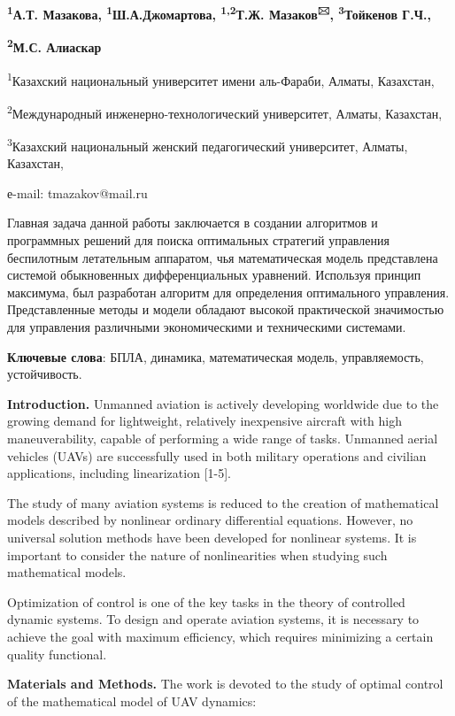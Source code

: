 {\bfseries \textsuperscript{1}А.Т. Мазакова,
\textsuperscript{1}Ш.А.Джомартова, \textsuperscript{1,2}Т.Ж.
Мазаков\textsuperscript{🖂}, \textsuperscript{3}Тойкенов Г.Ч.,}

{\bfseries \textsuperscript{2}М.С. Алиаскар}

\textsuperscript{1}Казахский национальный университет имени аль-Фараби,
Алматы, Казахстан,

\textsuperscript{2}Международный инженерно-технологический университет,
Алматы, Казахстан,

\textsuperscript{3}Казахский национальный женский педагогический
университет, Алматы, Казахстан,

е-mail: tmazakov@mail.ru

Главная задача данной работы заключается в создании алгоритмов и
программных решений для поиска оптимальных стратегий управления
беспилотным летательным аппаратом, чья математическая модель
представлена системой обыкновенных дифференциальных уравнений. Используя
принцип максимума, был разработан алгоритм для определения оптимального
управления. Представленные методы и модели обладают высокой практической
значимостью для управления различными экономическими и техническими
системами.

{\bfseries Ключевые слова}: БПЛА, динамика, математическая модель,
управляемость, устойчивость.

{\bfseries Introduction.} Unmanned aviation is actively developing
worldwide due to the growing demand for lightweight, relatively
inexpensive aircraft with high maneuverability, capable of performing a
wide range of tasks. Unmanned aerial vehicles (UAVs) are successfully
used in both military operations and civilian applications, including
linearization {[}1-5{]}.

The study of many aviation systems is reduced to the creation of
mathematical models described by nonlinear ordinary differential
equations. However, no universal solution methods have been developed
for nonlinear systems. It is important to consider the nature of
nonlinearities when studying such mathematical models.

Optimization of control is one of the key tasks in the theory of
controlled dynamic systems. To design and operate aviation systems, it
is necessary to achieve the goal with maximum efficiency, which requires
minimizing a certain quality functional.

{\bfseries Materials and Methods.} The work is devoted to the study of
optimal control of the mathematical model of UAV dynamics:

